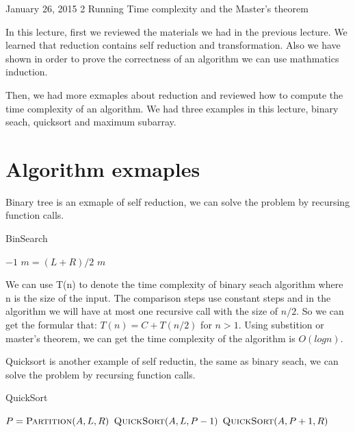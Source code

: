 \documentclass[usletter]{article}
\begin{document}
           {January 26, 2015}                          %
           {2}                                       %
           {Running Time complexity and the Master's theorem}  %

\noindent
In this lecture, first we reviewed the materials we had in the previous lecture. We learned that reduction contains self reduction and transformation. Also we have shown in order to prove the correctness of an algorithm we can use mathmatics induction.

Then, we had more exmaples about reduction and reviewed how to compute the time complexity of an algorithm. We had three examples in this lecture, binary seach, quicksort and maximum subarray.

\section{Algorithm exmaples}
Binary tree is an exmaple of self reduction, we can solve the problem by recursing function calls.
\begin{algorithm}
\caption{BinSearch}
\begin{algorithmic}[1]
	\Return $-1$
\EndIf
\State $m = (L+R)/2$
	\Return $m$
\EndIf
{}
	\Return {}
\EndIf
\Return {}
\EndProcedure
\end{algorithmic}
\end{algorithm}

We can use T(n) to denote the time complexity of binary seach algorithm where n is the size of the input. The comparison steps use constant steps and in the algorithm we will have at most one recursive call with the size of $n/2$. So we can get the formular that: $T(n) = C + T(n/2)$ for $n > 1$. Using substition or master's theorem, we can get the time complexity of the algorithm is $O(logn)$.

Quicksort is another example of self reductin, the same as binary seach, we can solve the problem by recursing function calls.
\begin{algorithm}
\caption{QuickSort}
\begin{algorithmic}[1]
	\State $P = \Call {Partition}{A, L, R}$
	\State $\Call{QuickSort}{A, L, P-1}$
	\State $\Call{QuickSort}{A, P+1, R}$
\EndIf
\EndProcedure
\end{algorithmic}
\end{algorithm}
\end{document}
